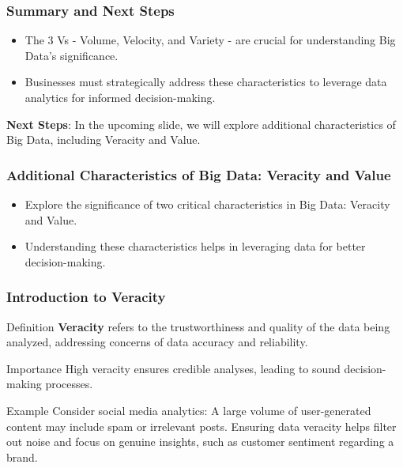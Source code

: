 \documentclass[aspectratio=169]{beamer}
\begin{document}
\begin{frame}[fragile]
    \frametitle{Summary and Next Steps}
    \begin{itemize}
        \item The 3 Vs - Volume, Velocity, and Variety - are crucial for understanding Big Data's significance.
        \item Businesses must strategically address these characteristics to leverage data analytics for informed decision-making.
    \end{itemize}

    \textbf{Next Steps}: In the upcoming slide, we will explore additional characteristics of Big Data, including Veracity and Value.
\end{frame}

\begin{frame}[fragile]
    \frametitle{Additional Characteristics of Big Data: Veracity and Value}
    \begin{itemize}
        \item Explore the significance of two critical characteristics in Big Data: Veracity and Value.
        \item Understanding these characteristics helps in leveraging data for better decision-making.
    \end{itemize}
\end{frame}

\begin{frame}[fragile]
    \frametitle{Introduction to Veracity}
    \begin{block}{Definition}
        \textbf{Veracity} refers to the trustworthiness and quality of the data being analyzed, addressing concerns of data accuracy and reliability.
    \end{block}
    
    \begin{block}{Importance}
        High veracity ensures credible analyses, leading to sound decision-making processes.
    \end{block}
    
    \begin{block}{Example}
        Consider social media analytics: A large volume of user-generated content may include spam or irrelevant posts. Ensuring data veracity helps filter out noise and focus on genuine insights, such as customer sentiment regarding a brand.
    \end{block}
\end{frame}
\end{document}
